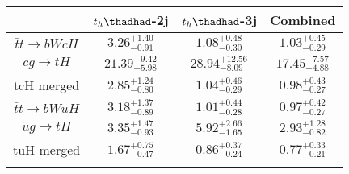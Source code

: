 
\centering
\begin{tabular}{cccc} \toprule\toprule
 & $t_h\thadhad$-2j & $t_h\thadhad$-3j & Combined\\\midrule
$\bar{t}t\to bWcH$ & $3.26^{+1.40}_{-0.91}$ & $1.08^{+0.48}_{-0.30}$ & $1.03^{+0.45}_{-0.29}$\\
$cg\to tH$ & $21.39^{+9.42}_{-5.98}$ & $28.94^{+12.56}_{-8.09}$ & $17.45^{+7.57}_{-4.88}$\\
tcH merged & $2.85^{+1.24}_{-0.80}$ & $1.04^{+0.46}_{-0.29}$ & $0.98^{+0.43}_{-0.27}$\\
$\bar{t}t\to bWuH$ & $3.18^{+1.37}_{-0.89}$ & $1.01^{+0.44}_{-0.28}$ & $0.97^{+0.42}_{-0.27}$\\
$ug\to tH$ & $3.35^{+1.47}_{-0.93}$ & $5.92^{+2.66}_{-1.65}$ & $2.93^{+1.28}_{-0.82}$\\
tuH merged & $1.67^{+0.75}_{-0.47}$ & $0.86^{+0.37}_{-0.24}$ & $0.77^{+0.33}_{-0.21}$\\
\bottomrule\bottomrule\\
\end{tabular}
